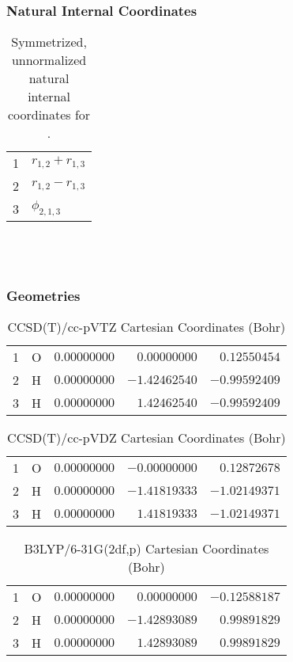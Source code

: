 \documentclass[10pt,oneside]{article}
\begin{document}
\clearpage

\subsubsection*{Natural Internal Coordinates}
\begin{table}[h!]
\centering
\caption{Symmetrized, unnormalized natural internal coordinates for .}
\small
\begin{tabular}{ll}
  1   & $r_{1,2} + r_{1,3}$ \\
  2   & $r_{1,2} - r_{1,3}$ \\
  3   & $\phi_{2,1,3}$ \\
\end{tabular}
\end{table}

\clearpage

\subsection{\ \ \ }

\subsubsection*{Geometries}
\begin{table}[h!]
\centering
\caption{CCSD(T)/cc-pVTZ Cartesian Coordinates (Bohr)}
\begin{tabular}{llrrr}
1  & O  & $ 0.00000000$ & $ 0.00000000$ & $ 0.12550454$ \\
2  & H  & $ 0.00000000$ & $-1.42462540$ & $-0.99592409$ \\
3  & H  & $ 0.00000000$ & $ 1.42462540$ & $-0.99592409$ \\
\end{tabular}
\end{table}

\begin{table}[h!]
\centering
\caption{CCSD(T)/cc-pVDZ Cartesian Coordinates (Bohr)}
\begin{tabular}{llrrr}
1  & O  & $ 0.00000000$ & $-0.00000000$ & $ 0.12872678$ \\
2  & H  & $ 0.00000000$ & $-1.41819333$ & $-1.02149371$ \\
3  & H  & $ 0.00000000$ & $ 1.41819333$ & $-1.02149371$ \\
\end{tabular}
\end{table}

\begin{table}[h!]
\centering
\caption{B3LYP/6-31G(2df,p) Cartesian Coordinates (Bohr)}
\begin{tabular}{llrrr}
1  & O  & $ 0.00000000$ & $ 0.00000000$ & $-0.12588187$ \\
2  & H  & $ 0.00000000$ & $-1.42893089$ & $ 0.99891829$ \\
3  & H  & $ 0.00000000$ & $ 1.42893089$ & $ 0.99891829$ \\
\end{tabular}
\end{table}
\end{document}
